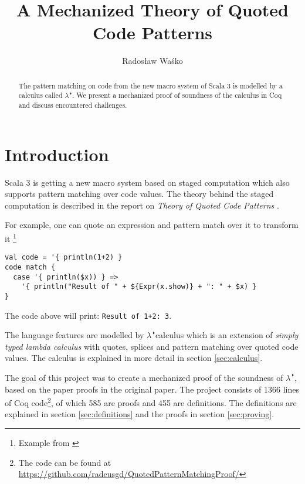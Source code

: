 \documentclass[runningheads]{article}
\newcommand{\calculus}{$\lambda^{\RIGHTcircle}$}
\begin{document}
\title{A Mechanized Theory of Quoted Code Patterns}
%
\author{Radosław Waśko}

%
%
%
\maketitle              %
\begin{abstract}
The pattern matching on code from the new macro system of Scala 3 is modelled by a calculus called \calculus. We present a mechanized proof of soundness of the calculus in Coq and discuss encountered challenges.
%
\end{abstract}
%
%
\section{Introduction}

Scala 3 is getting a new macro system based on staged computation \cite{dottydocMacro} which also supports pattern matching over code values. The theory behind the staged computation is described in the report on \textit{Theory of Quoted Code Patterns} \cite{QPM}. 

For example, one can quote an expression and pattern match over it to transform it \footnote{Example from \cite{QPM}}

\begin{lstlisting}[style=myScalaStyle]
val code = '{ println(1+2) }
code match {
  case '{ println($x)) } =>
    '{ println("Result of " + ${Expr(x.show)} + ": " + $x) }
}
\end{lstlisting}

The code above will print: \texttt{Result of 1+2: 3}.

The language features are modelled by \calculus calculus which is an extension of \textit{simply typed lambda calculus} with quotes, splices and pattern matching over quoted code values. The calculus is explained in more detail in section \ref{sec:calculus}.

The goal of this project was to create a mechanized proof of the soundness of \calculus, based on the paper proofs in the original paper. The project consists of 1366 lines of Coq code\footnote{The code can be found at  \href{https://github.com/radeusgd/QuotedPatternMatchingProof/}{https://github.com/radeusgd/QuotedPatternMatchingProof/}}, of which 585 are proofs and 455 are definitions. The definitions are explained in section \ref{sec:definitions} and the proofs in section \ref{sec:proving}.
\end{document}
